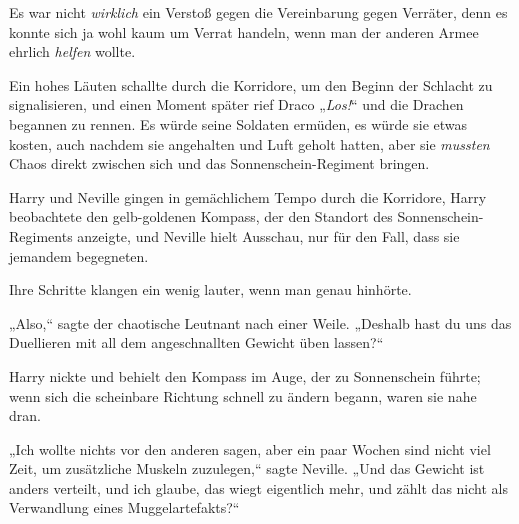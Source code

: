 Es war nicht \emph{wirklich} ein Verstoß gegen die Vereinbarung gegen Verräter, denn es konnte sich ja wohl kaum um Verrat handeln, wenn man der anderen Armee ehrlich \emph{helfen} wollte.

Ein hohes Läuten schallte durch die Korridore, um den Beginn der Schlacht zu signalisieren, und einen Moment später rief Draco „\emph{Los!}“ und die Drachen begannen zu rennen. Es würde seine Soldaten ermüden, es würde sie etwas kosten, auch nachdem sie angehalten und Luft geholt hatten, aber sie \emph{mussten} Chaos direkt zwischen sich und das Sonnenschein-Regiment bringen.

\later

Harry und Neville gingen in gemächlichem Tempo durch die Korridore, Harry beobachtete den gelb-goldenen Kompass, der den Standort des Sonnenschein-Regiments anzeigte, und Neville hielt Ausschau, nur für den Fall, dass sie jemandem begegneten.

Ihre Schritte klangen ein wenig lauter, wenn man genau hinhörte.

„Also,“ sagte der chaotische Leutnant nach einer Weile. „Deshalb hast du uns das Duellieren mit all dem angeschnallten Gewicht üben lassen?“

Harry nickte und behielt den Kompass im Auge, der zu Sonnenschein führte; wenn sich die scheinbare Richtung schnell zu ändern begann, waren sie nahe dran.

„Ich wollte nichts vor den anderen sagen, aber ein paar Wochen sind nicht viel Zeit, um zusätzliche Muskeln zuzulegen,“ sagte Neville. „Und das Gewicht ist anders verteilt, und ich glaube, das wiegt eigentlich mehr, und zählt das nicht als Verwandlung eines Muggelartefakts?“

